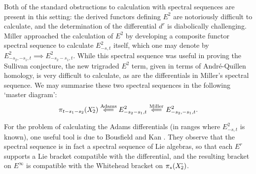\documentclass[11pt]{article}
\theoremstyle{plain}
\begin{document}
Both of the standard obstructions to calculation with spectral sequences are present in this setting: the derived functors defining $E^2$ are notoriously difficult to calculate, and the determination of the differential $d^r$ is diabolically challenging. Miller \cite{MillerSullivanConjecture.pdf} approached the calculation of $E^2$ by developing a composite functor spectral sequence to calculate $E^2_{-s,t}$ itself, which one may denote by $E^2_{-s_2,-s_1,t}\implies E^2_{-s_2-s_1,t}$. While this spectral sequence was useful in proving the Sullivan conjecture, the new trigraded $E^2$ term, given in terms of Andr\'e-Quillen homology, is very difficult to calculate, as are the differentials in Miller's spectral sequence. We may summarise these two spectral sequences in the following `master diagram':
\[\pi_{t-s_1-s_2}(X{\hat{\,}_\textup{\!\!2}})\overset{\textup{Adams}}{\impliedby}E^2_{-s_2-s_1,t}\overset{\textup{Miller}}{\impliedby} E^2_{-s_2,-s_1,t}.\]

For the problem of calculating the Adams differentials (in ranges where $E^2_{-s,t}$ is known), one useful tool is due to Bousfield and Kan \cite{BK_pairings_products.pdf}. They observe that the spectral sequence is in fact a spectral sequence of Lie algebras, so that each $E^r$ supports a Lie bracket compatible with the differential, and the resulting bracket on $E^\infty$ is compatible with the Whitehead bracket on $\pi_*(X{\hat{\,}_\textup{\!\!2}})$.
\end{document}
